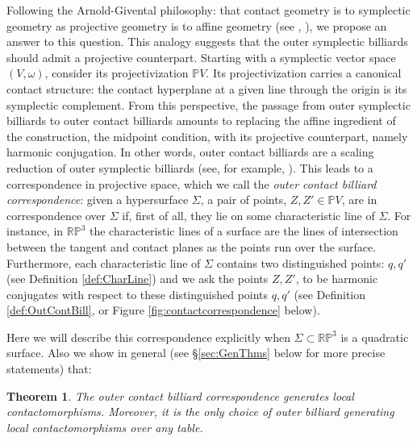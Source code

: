 \documentclass{article}
\newtheorem*{thmN}{Theorem}
\begin{document}
Following the Arnold-Givental philosophy: that contact geometry is to symplectic geometry as projective geometry is to affine geometry (see \cite{EDSIV}, \cite{tabachnikov1993geometry}), we propose an answer to this question. This analogy suggests that the outer symplectic billiards should admit a projective counterpart. Starting with a symplectic vector space $(V, \omega)$, consider its projectivization $\mathbb{P}V$. Its projectivization carries a canonical contact structure: the contact hyperplane at a given line through the origin is its symplectic complement. From this perspective, the passage from outer symplectic billiards to outer contact billiards amounts to replacing the affine ingredient of the construction, the midpoint condition, with its projective counterpart, namely harmonic conjugation. In other words, outer contact billiards are a scaling reduction of outer symplectic billiards (see, for example, \cite{ContRed}). This leads to a correspondence in projective space, which we call the {\em outer contact billiard correspondence}: given a hypersurface $\Sigma$, a pair of points, $Z,Z'\in\mathbb{P}V$, are in correspondence over $\Sigma$ if, first of all, they lie on some characteristic line of $\Sigma$. For instance, in $\mathbb{RP}^3$ the characteristic lines of a surface are the lines of intersection between the tangent and contact planes as the points run over the surface. Furthermore, each characteristic line of $\Sigma$ contains two distinguished points: $q,q'$ (see Definition \ref{def:CharLine}) and we ask the points $Z,Z'$, to be harmonic conjugates with respect to these distinguished points $q, q'$ (see Definition 
\ref{def:OutContBill}, or Figure \ref{fig:contactcorrespondence} below).


Here we will describe this correspondence explicitly when $\Sigma\subset\mathbb{RP}^3$ is a quadratic surface. Also we show in general 
(see \S \ref{sec:GenThms} below for more precise statements) that:
\begin{thmN}
    The outer contact billiard correspondence generates local contactomorphisms. Moreover, it is the only choice of outer billiard generating local contactomorphisms over any table.
\end{thmN}
\end{document}
